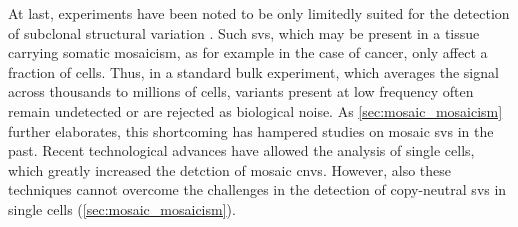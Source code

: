 At last, \mps experiments have been noted to be only limitedly suited for the
detection of subclonal structural variation \citep{Forsberg2017}. Such \acp{sv},
which may be present in a tissue carrying somatic mosaicism, as for example in the case of cancer,
only affect a fraction of cells. Thus, in a standard bulk \mps experiment, which
averages the signal across thousands to millions of cells, variants present at
low frequency often remain undetected or are rejected as biological noise. As \cref{sec:mosaic_mosaicism} further
elaborates, this shortcoming has hampered studies on mosaic \acp{sv} in the past.
Recent technological advances have allowed the analysis of single cells, which greatly
increased the detction of mosaic \acp{cnv}. However, also
these techniques cannot overcome the challenges in the detection of copy-neutral
\acp{sv} in single cells (\cref{sec:mosaic_mosaicism}).
